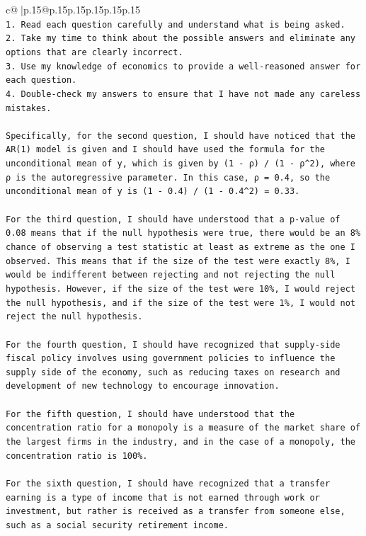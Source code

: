 \documentclass{article}
\begin{document}
{\begin{supertabular}{c@{$\;$}|p{.15\linewidth}@{}p{.15\linewidth}p{.15\linewidth}p{.15\linewidth}p{.15\linewidth}p{.15\linewidth}}
{{{\\ 
\texttt{1. Read each question carefully and understand what is being asked.} \\
\texttt{2. Take my time to think about the possible answers and eliminate any options that are clearly incorrect.} \\
\texttt{3. Use my knowledge of economics to provide a well{-}reasoned answer for each question.} \\
\texttt{4. Double{-}check my answers to ensure that I have not made any careless mistakes.} \\
\\ 
\texttt{Specifically, for the second question, I should have noticed that the AR(1) model is given and I should have used the formula for the unconditional mean of y, which is given by (1 {-} ρ) / (1 {-} ρ\^{}2), where ρ is the autoregressive parameter. In this case, ρ = 0.4, so the unconditional mean of y is (1 {-} 0.4) / (1 {-} 0.4\^{}2) = 0.33.} \\
\\ 
\texttt{For the third question, I should have understood that a p{-}value of 0.08 means that if the null hypothesis were true, there would be an 8\% chance of observing a test statistic at least as extreme as the one I observed. This means that if the size of the test were exactly 8\%, I would be indifferent between rejecting and not rejecting the null hypothesis. However, if the size of the test were 10\%, I would reject the null hypothesis, and if the size of the test were 1\%, I would not reject the null hypothesis.} \\
\\ 
\texttt{For the fourth question, I should have recognized that supply{-}side fiscal policy involves using government policies to influence the supply side of the economy, such as reducing taxes on research and development of new technology to encourage innovation.} \\
\\ 
\texttt{For the fifth question, I should have understood that the concentration ratio for a monopoly is a measure of the market share of the largest firms in the industry, and in the case of a monopoly, the concentration ratio is 100\%.} \\
\\ 
\texttt{For the sixth question, I should have recognized that a transfer earning is a type of income that is not earned through work or investment, but rather is received as a transfer from someone else, such as a social security retirement income.} \\
}}}
\end{supertabular}}
\end{document}
